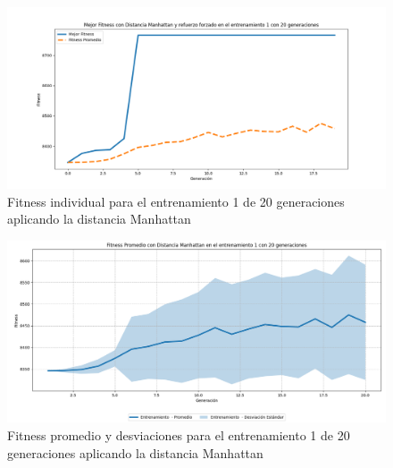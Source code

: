 \documentclass[lettersize, journal]{IEEEtran}
\begin{document}
\begin{figure}[H]
    \centering
    \includegraphics[width=0.9 \linewidth]{Manhattan/Fitness_individual_20Gen/Fitness_1_Manh_20Gen.png}
    \caption{Fitness individual para el entrenamiento 1 de 20 generaciones aplicando la distancia Manhattan}
    \label{fig:manhattan_1_20}
\end{figure}
\begin{figure}[H]
    \centering
    \includegraphics[width=0.9 \linewidth]{Manhattan/Fitness_individual_20Gen/Fitness_1_Manh_20Gen_Sombra.png}
    \caption{Fitness promedio y desviaciones para el entrenamiento 1 de 20 generaciones aplicando la distancia Manhattan}
    \label{fig:manhattan_1_20_sombra}
\end{figure}
\end{document}
